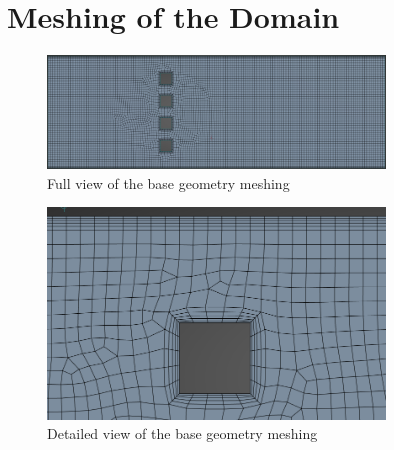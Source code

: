 \chapter{Meshing of the Domain}
\label{chapter:meshing}

\begin{figure}[htbp]
    \centering
    \includegraphics[width=0.8\textwidth]{img/meshing_base_geometry_full_view}
    \caption{Full view of the base geometry meshing}
    \label{fig:meshing_base_geometry_full_view}
\end{figure}


\begin{figure}[htbp]
    \centering
    \includegraphics[width=0.8\textwidth]{img/meshing_base_geometry_detailed_view}
    \caption{Detailed view of the base geometry meshing}
    \label{fig:meshing_base_geometry_detailed_view}
\end{figure}


